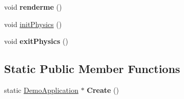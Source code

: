 \begin{DoxyCompactItemize}
\item 
\hypertarget{class_fork_lift_demo_acf8a05b924185804a3ef0df3eb7adb2e}{void {\bfseries renderme} ()}\label{class_fork_lift_demo_acf8a05b924185804a3ef0df3eb7adb2e}

\item 
void \hyperlink{class_fork_lift_demo_afd1af4ba9a1d805e00ef727edc0ca165}{init\+Physics} ()
\item 
\hypertarget{class_fork_lift_demo_a5479dd6832883eff57d1f887a01ebf22}{void {\bfseries exit\+Physics} ()}\label{class_fork_lift_demo_a5479dd6832883eff57d1f887a01ebf22}

\end{DoxyCompactItemize}
\subsection*{Static Public Member Functions}
\begin{DoxyCompactItemize}
\item 
\hypertarget{class_fork_lift_demo_ae2aed417eb3f0c25b2adddf2907ddff9}{static \hyperlink{class_demo_application}{Demo\+Application} $\ast$ {\bfseries Create} ()}\label{class_fork_lift_demo_ae2aed417eb3f0c25b2adddf2907ddff9}

\end{DoxyCompactItemize}
